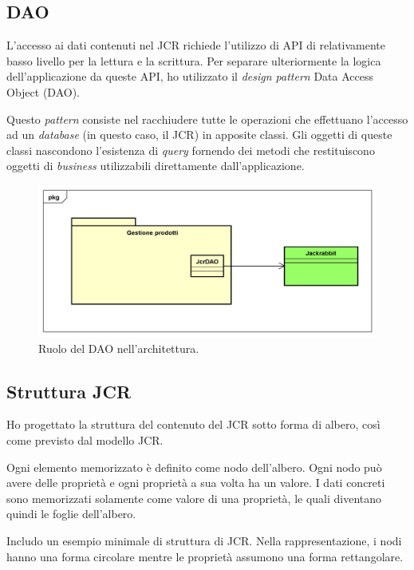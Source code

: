 	\subsection{DAO}
		L'accesso ai dati contenuti nel JCR richiede l'utilizzo di API di relativamente basso livello per la lettura e la scrittura. Per separare ulteriormente la logica dell'applicazione da queste API, ho utilizzato il \textit{design pattern} Data Access Object (DAO).
		
		Questo \textit{pattern} consiste nel racchiudere tutte le operazioni che effettuano l'accesso ad un \textit{database} (in questo caso, il JCR) in apposite classi. Gli oggetti di queste classi nascondono l'esistenza di \textit{query} fornendo dei metodi che restituiscono oggetti di \textit{business} utilizzabili direttamente dall'applicazione.
		
		\begin{figure}[H]
			\centering
			\includegraphics[scale=0.4]{immagini/dao}
			\caption{Ruolo del DAO nell'architettura.}
		\end{figure}
	
	\subsection{Struttura JCR}
		Ho progettato la struttura del contenuto del JCR sotto forma di albero, così come previsto dal modello JCR.
		
		Ogni elemento memorizzato è definito come nodo dell'albero. Ogni nodo può avere delle proprietà e ogni proprietà a sua volta ha un valore. I dati concreti sono memorizzati solamente come valore di una proprietà, le quali diventano quindi le foglie dell'albero.
		
		Includo un esempio minimale di struttura di JCR. Nella rappresentazione, i nodi hanno una forma circolare mentre le proprietà assumono una forma rettangolare.
		
